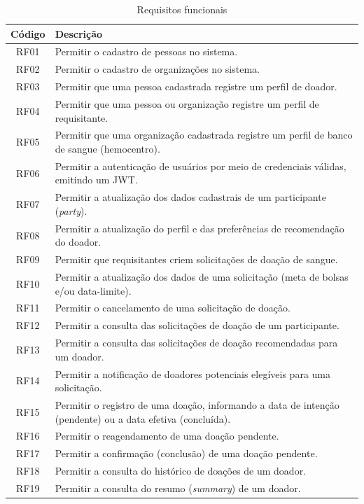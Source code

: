 \begin{table}[H]
  \centering
  \caption{Requisitos funcionais}
  \label{tab:rf}
  \small
  \begin{tabularx}{\textwidth}{c X}
    \toprule
    \textbf{Código} & \textbf{Descrição} \\
    \midrule
    RF01 & Permitir o cadastro de pessoas no sistema. \\
    RF02 & Permitir o cadastro de organizações no sistema. \\
    RF03 & Permitir que uma pessoa cadastrada registre um perfil de doador. \\
    RF04 & Permitir que uma pessoa ou organização registre um perfil de requisitante. \\
    RF05 & Permitir que uma organização cadastrada registre um perfil de banco de sangue (hemocentro). \\
    RF06 & Permitir a autenticação de usuários por meio de credenciais válidas, emitindo um JWT. \\
    RF07 & Permitir a atualização dos dados cadastrais de um participante (\textit{party}). \\
    RF08 & Permitir a atualização do perfil e das preferências de recomendação do doador. \\
    RF09 & Permitir que requisitantes criem solicitações de doação de sangue. \\
    RF10 & Permitir a atualização dos dados de uma solicitação (meta de bolsas e/ou data-limite). \\
    RF11 & Permitir o cancelamento de uma solicitação de doação. \\
    RF12 & Permitir a consulta das solicitações de doação de um participante. \\
    RF13 & Permitir a consulta das solicitações de doação recomendadas para um doador. \\
    RF14 & Permitir a notificação de doadores potenciais elegíveis para uma solicitação. \\
    RF15 & Permitir o registro de uma doação, informando a data de intenção (pendente) ou a data efetiva (concluída). \\
    RF16 & Permitir o reagendamento de uma doação pendente. \\
    RF17 & Permitir a confirmação (conclusão) de uma doação pendente. \\
    RF18 & Permitir a consulta do histórico de doações de um doador. \\
    RF19 & Permitir a consulta do resumo (\textit{summary}) de um doador. \\
    \bottomrule
  \end{tabularx}
\end{table}


